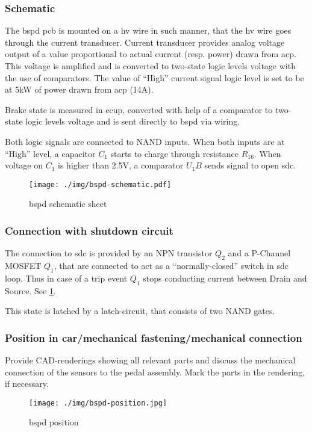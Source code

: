\subsubsection{Schematic}
The \gls{bspd} \gls{pcb} is mounted on a \gls{hv} wire in such manner, that the \gls{hv} wire goes through the
current transducer. Current transducer provides analog voltage output of a value proportional to
actual current (resp. power) drawn from \gls{acp}. This voltage is amplified and is converted to two-state
logic levels voltage with the use of comparators. The value of “High” current signal logic level
is set to be at 5kW of power drawn from \gls{acp} (14A).

Brake state is measured in \gls{ecup}, converted with help of a comparator to two-state logic levels
voltage and is sent directly to \gls{bspd} via wiring.

Both logic signals are connected to NAND inputs. When both inputs are at “High” level, a
capacitor $C_1$ starts to charge through resistance $R_16$. When voltage on $C_1$ is higher than 2.5V, a
comparator $U_1B$ sends signal to open \gls{sdc}.

\begin{figure}[H]
	\centering
	\texttt{[image: ./img/bspd-schematic.pdf]}
	\caption{\gls{bspd} schematic sheet}
	\label{fig:BSPD-schematic}
\end{figure}

\subsubsection{Connection with shutdown circuit}
The connection to \gls{sdc} is provided by an NPN transistor $Q_2$ and a P-Channel MOSFET $Q_1$, that
are connected to act as a “normally-closed” switch in \gls{sdc} loop. Thus in case of a trip event $Q_1$
stops conducting current between Drain and Source. See \ref{fig:BSPD-schematic}.

This state is latched by a latch-circuit, that consists of two NAND gates.

\iffalse
\begin{figure}[H]
	\centering
	\texttt{[image: ./img/bspd-position.jpg]}
	\caption{\gls{bspd} connection with \gls{sdc}.}
	\label{fig:BSPD-conn}
\end{figure}\fi

\subsubsection{Position in car/mechanical fastening/mechanical connection}
Provide CAD-renderings showing all relevant parts and discuss the mechanical connection of the sensors to the pedal assembly. Mark the parts in the rendering, if necessary.

\begin{figure}[H]
	\centering
	\texttt{[image: ./img/bspd-position.jpg]}
	\caption{\gls{bspd} position}
	\label{fig:BSPD-position}
\end{figure}
